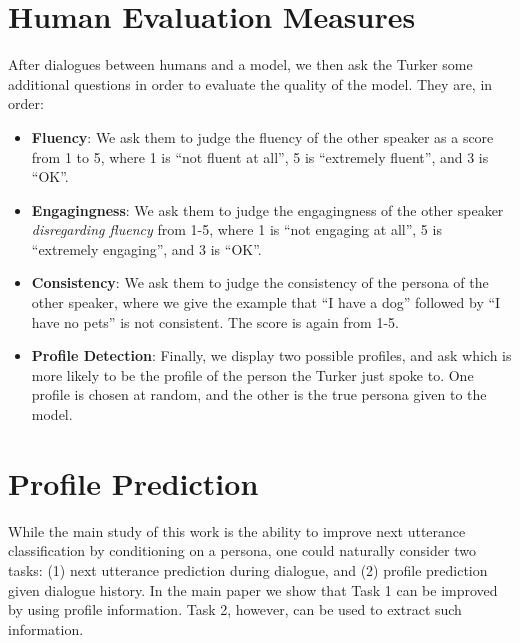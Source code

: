 \documentclass[11pt,a4paper]{article}
\begin{document}
\section{Human Evaluation Measures}

After dialogues between humans and a model, we then ask the Turker some additional questions in order to evaluate the quality of the model. 
They are, in order:
\begin{itemize}
\item {\bf Fluency}: We ask them to judge the fluency of the other speaker as a score from 1 to 5, where 1 is ``not fluent at all'', 5 is ``extremely fluent'', and 3 is ``OK''. 

\item {\bf Engagingness}: We ask them to judge the engagingness of the other speaker {\em disregarding fluency} from 1-5, where 1 is ``not engaging at all'', 5 is ``extremely engaging'', and 3 is ``OK''.

\item {\bf Consistency}: We ask them to judge the consistency of the persona of the other speaker, where we give the example that ``I have a dog''  followed by ``I have no pets'' is not consistent. The score is again from 1-5.

\item {\bf Profile Detection}: Finally, we display two possible profiles, and ask which is more likely to be the profile of the person the Turker just spoke to. One profile is chosen at random, and the other is the true persona given to the model.
\end{itemize}

\section{Profile Prediction}\label{app:profile-pred}

While the main study of this work is the ability to improve next utterance classification
by conditioning on a persona, 
one could naturally consider two tasks:
(1) next utterance prediction during dialogue, and (2) profile prediction given dialogue history. 
In the main paper we show that Task 1 can be improved by using profile information.
Task 2, however, can be used to extract such information.
\end{document}
